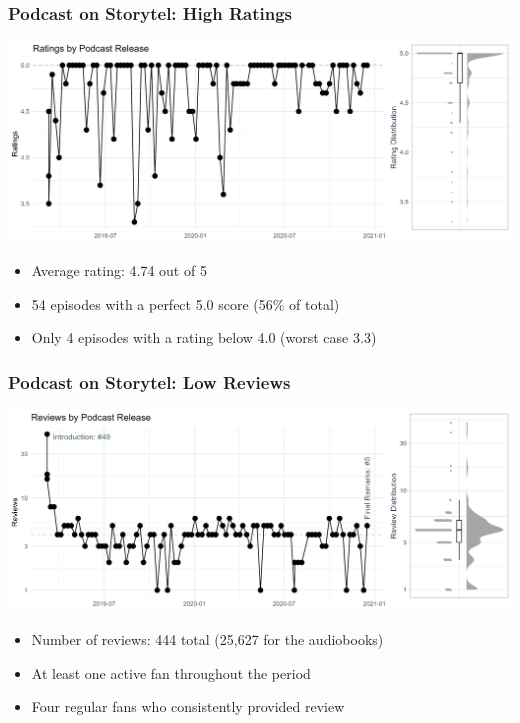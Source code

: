 \begin{frame}
    \frametitle{Podcast on Storytel: High Ratings}
    \includegraphics[width=\textwidth]{../R/figures/iskisur_ratings}
    \begin{itemize}
        \item Average rating: 4.74 out of 5
        \item 54 episodes with a perfect 5.0 score (56\% of total)
        \item Only 4 episodes with a rating below 4.0 (worst case 3.3)
    \end{itemize}
\end{frame}

\begin{frame}
    \frametitle{Podcast on Storytel: Low Reviews}
    \includegraphics[width=\textwidth]{../R/figures/iskisur_reviews}

    \begin{itemize}
        \item Number of reviews: 444 total (25,627 for the audiobooks)
        \item At least one active fan throughout the period
        \item Four regular fans who consistently provided review
    \end{itemize}


\end{frame}

